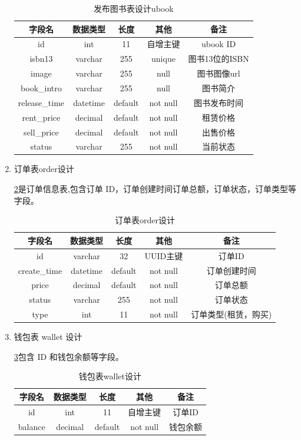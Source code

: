 \begin{enumerate}
	\begin{table}[h]
		\centering
		\caption{发布图书表设计ubook}
		\label{ubook_table}
		\begin{tabular}{ccccc}
			\toprule
			\textbf{字段名} & \textbf{数据类型} & \textbf{长度} & \textbf{其他}  & \textbf{备注} \\
			\midrule
			id  & int & 11 & 自增主键 & ubook ID \\
			isbn13 & varchar & 255 & unique & 图书13位的ISBN \\
			image & varchar & 255 & null & 图书图像url \\
			book\_intro & varchar & 255 & null & 图书简介 \\
			release\_time & datetime & default & not null & 图书发布时间 \\
			rent\_price & decimal & default & not null & 租赁价格 \\
			sell\_price & decimal & default & not null & 出售价格 \\
			status & varchar & 255 & not null & 当前状态 \\
			\bottomrule
		\end{tabular}
	\end{table}
	\item 订单表order设计
	
	\cref{order_table}是订单信息表,包含订单 ID，订单创建时间订单总额，订单状态，订单类型等字段。
	\begin{table}[h]
		\centering
		\caption{订单表order设计}
		\label{order_table}
		\begin{tabular}{ccccc}
			\toprule
			\textbf{字段名} & \textbf{数据类型} & \textbf{长度} & \textbf{其他}  & \textbf{备注} \\
			\midrule
			id  & varchar & 32 & UUID主键 & 订单ID \\
			create\_time & datetime & default & not null & 订单创建时间 \\
			price & decimal & default & not null & 订单总额 \\
			status & varchar & 255 & not null & 订单状态 \\
			type & int & 11 & not null & 订单类型(租赁，购买) \\
			\bottomrule
		\end{tabular}
	\end{table}
	\item 钱包表 wallet 设计
	
	\cref{wallet_table}包含 ID 和钱包余额等字段。
 	\begin{table}[h]
		\centering
		\caption{钱包表wallet设计}
		\label{wallet_table}
		\begin{tabular}{ccccc}
			\toprule
			\textbf{字段名} & \textbf{数据类型} & \textbf{长度} & \textbf{其他}  & \textbf{备注} \\
			\midrule
			id  & int & 11 & 自增主键 & 订单ID \\
			balance & decimal & default & not null & 钱包余额 \\
			\bottomrule
		\end{tabular}
	\end{table}
\end{enumerate}

